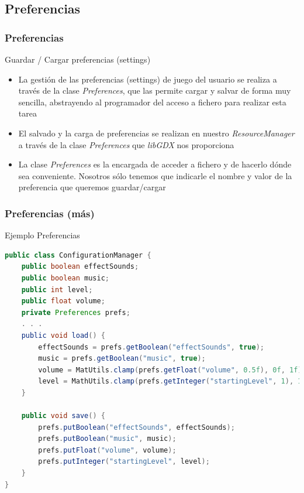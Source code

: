 \documentclass[xcolor={dvipsnames}]{beamer}
\begin{document}
\subsection{Preferencias}
\begin{frame}[fragile]\frametitle{Preferencias}
	\begin{block}{Guardar / Cargar preferencias (settings)}
	\begin{itemize}
		\item La gestión de las preferencias (settings) de juego del usuario se realiza a través de la clase \emph{Preferences}, que las permite cargar y salvar de forma muy sencilla, abstrayendo al programador del acceso a fichero para realizar esta tarea
		\item El salvado y la carga de preferencias se realizan en nuestro \emph{ResourceManager} a través de la clase \emph{Preferences} que \emph{\textcolor{resalta}{libGDX}} nos proporciona
		\item La clase \emph{Preferences} es la encargada de acceder a fichero y de hacerlo dónde sea conveniente. Nosotros sólo tenemos que indicarle el nombre y valor de la preferencia que queremos guardar/cargar
	\end{itemize}
	\end{block}
\end{frame}

\begin{frame}[fragile]\frametitle{Preferencias (más)}
	\begin{exampleblock}{Ejemplo Preferencias}
	\begin{lstlisting}[language=java]
public class ConfigurationManager {
    public boolean effectSounds;
    public boolean music;
    public int level;
    public float volume;
    private Preferences prefs;
    . . .
    public void load() {
        effectSounds = prefs.getBoolean("effectSounds", true);
        music = prefs.getBoolean("music", true);
        volume = MatUtils.clamp(prefs.getFloat("volume", 0.5f), 0f, 1f);
        level = MathUtils.clamp(prefs.getInteger("startingLevel", 1), 1, 4);
    }

    public void save() {
        prefs.putBoolean("effectSounds", effectSounds);
        prefs.putBoolean("music", music);
        prefs.putFloat("volume", volume);
        prefs.putInteger("startingLevel", level);
    }
}
	\end{lstlisting}
	\end{exampleblock}
\end{frame}
\end{document}
